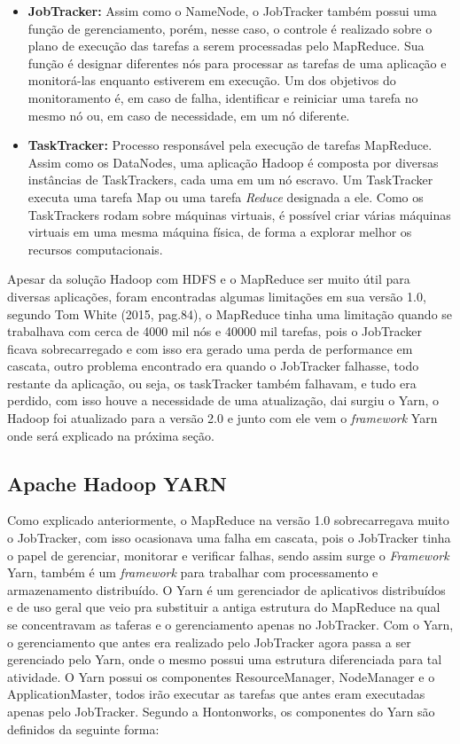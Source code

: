 \begin{itemize}
	\item \textbf{JobTracker:} Assim como o NameNode, o JobTracker também possui uma função de gerenciamento, porém, nesse caso, o controle é realizado sobre o plano de execução das tarefas a serem processadas pelo MapReduce. Sua função é designar diferentes nós para processar as tarefas de uma aplicação e monitorá-las enquanto estiverem em execução. Um dos objetivos do monitoramento é, em caso de falha, identificar e reiniciar uma tarefa no mesmo nó ou, em caso de necessidade, em um nó diferente.\\
    
    \item \textbf{TaskTracker:} Processo responsável pela execução de tarefas MapReduce. Assim como os DataNodes, uma aplicação Hadoop é composta por diversas instâncias de TaskTrackers, cada uma em um nó escravo. Um TaskTracker executa uma tarefa Map ou uma tarefa \textit{Reduce} designada a ele. Como os TaskTrackers rodam sobre máquinas virtuais, é possível criar várias máquinas virtuais em uma mesma máquina física, de forma a explorar melhor os recursos computacionais.
\end{itemize}

Apesar da solução Hadoop com HDFS e o MapReduce ser muito útil para diversas aplicações, foram encontradas algumas limitações em sua versão 1.0, segundo Tom White (2015, pag.84), o MapReduce tinha uma limitação quando se trabalhava com cerca de 4000 mil nós e 40000 mil tarefas, pois o JobTracker ficava sobrecarregado e com isso era gerado uma perda de performance em cascata, outro problema encontrado era quando o JobTracker falhasse, todo restante da aplicação, ou seja, os taskTracker também falhavam, e tudo era perdido, com isso houve a necessidade de uma atualização, dai surgiu o Yarn, o Hadoop foi atualizado para a versão 2.0 e junto com ele vem o \textit{framework} Yarn onde será explicado na próxima seção.

\subsection{Apache Hadoop YARN}

Como explicado anteriormente, o MapReduce na versão 1.0 sobrecarregava muito o JobTracker, com isso ocasionava uma falha em cascata, pois o JobTracker tinha o papel de gerenciar, monitorar e verificar falhas, sendo assim surge o \textit{Framework} Yarn, também é um \textit{framework} para trabalhar com processamento e armazenamento distribuído. O Yarn é um gerenciador de aplicativos distribuídos e de uso geral que veio pra substituir a antiga estrutura do MapReduce na qual se concentravam as taferas e o gerenciamento apenas no JobTracker. Com o Yarn, o gerenciamento que antes era realizado pelo JobTracker agora passa a ser gerenciado pelo Yarn, onde o mesmo possui uma estrutura diferenciada para tal atividade. O Yarn possui os componentes ResourceManager, NodeManager e o ApplicationMaster, todos irão executar as tarefas que antes eram executadas apenas pelo JobTracker. Segundo a Hontonworks, os componentes do Yarn são definidos da seguinte forma:




